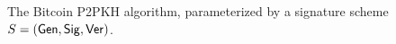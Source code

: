 \begin{figure}[t]
\begin{algorithm}[H]
    \caption{\label{alg.p2pkh} The Bitcoin P2PKH algorithm,
    parameterized by a signature scheme $S = (\mathsf{Gen}, \mathsf{Sig}, \mathsf{Ver})$.}
    \begin{algorithmic}[1]
            \State{}
        \EndFunction
            \State{}
        \EndFunction
        \vskip8pt
    \end{algorithmic}
\end{algorithm}
\end{figure}
